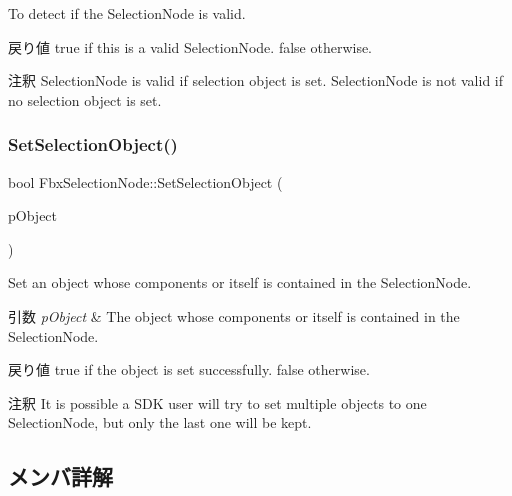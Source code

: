To detect if the Selection\+Node is valid. \begin{DoxyReturn}{戻り値}
{\ttfamily true} if this is a valid Selection\+Node. {\ttfamily false} otherwise. 
\end{DoxyReturn}
\begin{DoxyRemark}{注釈}
Selection\+Node is valid if selection object is set. Selection\+Node is not valid if no selection object is set. 
\end{DoxyRemark}
\mbox{\label{class_fbx_selection_node_a6682d7ec3a7f7b9083962c212e7badd2}} 
\subsubsection{\texorpdfstring{Set\+Selection\+Object()}{SetSelectionObject()}}
{\footnotesize\ttfamily bool Fbx\+Selection\+Node\+::\+Set\+Selection\+Object (\begin{DoxyParamCaption}\item[{\hyperlink{class_fbx_object}{Fbx\+Object} $\ast$}]{p\+Object }\end{DoxyParamCaption})}

Set an object whose components or itself is contained in the Selection\+Node. 
\begin{DoxyParams}{引数}
{\em p\+Object} & The object whose components or itself is contained in the Selection\+Node. \\
\hline
\end{DoxyParams}
\begin{DoxyReturn}{戻り値}
{\ttfamily true} if the object is set successfully. {\ttfamily false} otherwise. 
\end{DoxyReturn}
\begin{DoxyRemark}{注釈}
It is possible a S\+DK user will try to set multiple objects to one Selection\+Node, but only the last one will be kept. 
\end{DoxyRemark}


\subsection{メンバ詳解}
\mbox{\label{class_fbx_selection_node_a08402c700791599a3d025a55d52f725e}} 
